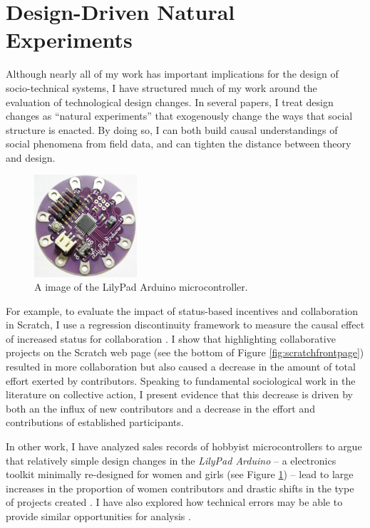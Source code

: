 \documentclass[10pt]{memoir}
\begin{document}
\section{Design-Driven Natural Experiments}

Although nearly all of my work has important implications for the
design of socio-technical systems, I have structured much of my work
around the evaluation of technological design changes. In several
papers, I treat design changes as ``natural experiments'' that
exogenously change the ways that social structure is enacted. By doing
so, I can both build causal understandings of social phenomena from
field data, and can tighten the distance between theory and design.

\begin{figure}
 \vspace{-1em}
 \begin{centering}
 \includegraphics[width=1.5in]{figures/lilypad.png}
 \caption{A image of the LilyPad Arduino microcontroller.}
 \label{fig:lilypad}
 \end{centering}
 \vspace{-1em}
\end{figure}

For example, to evaluate the impact of status-based incentives and
collaboration in Scratch, I use a regression discontinuity framework
to measure the causal effect of increased status for collaboration
\cite{hill_causal_2012}. I show that highlighting collaborative
projects on the Scratch web page (see the bottom of Figure
\ref{fig:scratchfrontpage}) resulted in more collaboration but also
caused a decrease in the amount of total effort exerted by
contributors. Speaking to fundamental sociological work in the
literature on collective action, I present evidence that this decrease
is driven by both an the influx of new contributors and a decrease in
the effort and contributions of established participants.

In other work, I have analyzed sales records of hobbyist
microcontrollers to argue that relatively simple design changes in the
\emph{LilyPad Arduino} -- a electronics toolkit minimally re-designed
for women and girls (see Figure \ref{fig:lilypad}) -- lead to large
increases in the proportion of women contributors and drastic shifts
in the type of projects created \cite{buechley_lilypad_2010}. I have
also explored how technical errors may be able to provide similar
opportunities for analysis \cite{hill_revealing_2010}.
\end{document}
